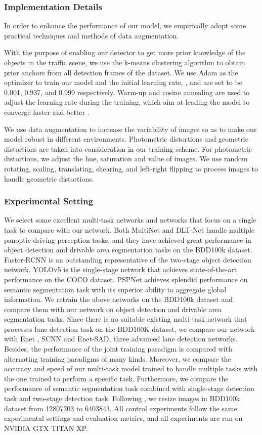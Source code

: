 \documentclass[10pt,twocolumn,letterpaper]{article}
\begin{document}
\subsubsection{Implementation Details}

In order to enhance the performance of our model, we empirically adopt some practical techniques and methods of data augmentation.

With the purpose of enabling our detector to get more prior knowledge of the objects in the traffic scene, we use the k-means clustering algorithm to obtain prior anchors from all detection frames of the dataset. We use Adam as the optimizer to train our model and the initial learning rate, , and  are set to be 0.001, 0.937, and 0.999 respectively. Warm-up and cosine annealing are used to adjust the learning rate during the training, which aim at leading the model to converge faster and better \cite{warmupandcos}.

We use data augmentation to increase the variability of images so as to make our model robust in different environments. Photometric distortions and geometric distortions are taken into consideration in our training scheme. For photometric distortions, we adjust the hue, saturation and value of images. We use random rotating, scaling, translating, shearing, and left-right flipping to process images to handle geometric distortions.


\subsubsection{Experimental Setting}

We select some excellent multi-task networks and networks that focus on a single task to compare with our network. Both MultiNet and DLT-Net handle multiple panoptic driving perception tasks, and they have achieved great performance in object detection and drivable area segmentation tasks on the BDD100k dataset. Faster-RCNN is an outstanding representative of the two-stage object detection network. YOLOv5 is the single-stage network that achieves state-of-the-art performance on the COCO dataset. PSPNet achieves splendid performance on semantic segmentation task with its superior ability to aggregate global information. We retrain the above networks on the BDD100k dataset and compare them with our network on object detection and drivable area segmentation tasks. Since there is no suitable existing multi-task network that processes lane detection task on the BDD100K dataset, we compare our network with Enet \cite{enet}, SCNN and Enet-SAD, three advanced lane detection networks. Besides, the performance of the joint training paradigm is compared with alternating training paradigms of many kinds. Moreover, we compare the accuracy and speed of our multi-task model trained to handle multiple tasks with the one trained to perform a specific task. Furthermore, we compare the performance of semantic segmentation task combined with single-stage detection task and two-stage detection task. Following \cite{sad-enet}, we resize images in BDD100k dataset from 12807203 to 6403843. All control experiments follow the same experimental settings and evaluation metrics, and all experiments are run on NVIDIA GTX TITAN XP.
\end{document}
